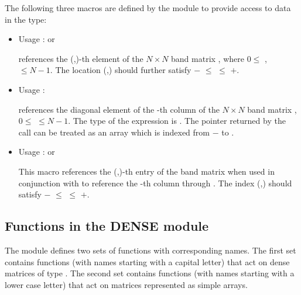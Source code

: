 The following three macros are defined by the {\band} module to provide
access to data in the  type:
\begin{itemize}
\item {}
  \par Usage :  or 
  \par {} references the (,)-th element of the
  $N \times N$ band matrix , where $0 \le$ ,  $\le N-1$.
  The location (,) should further satisfy 
  $-$ $\le$  $\le$ $+$.
\item {}
  \par Usage : 
  \par {} references the diagonal element of the -th
  column of the $N \times N$ band matrix , $0 \le$  $\le N-1$.
  The type of the expression  is . 
  The pointer returned by the call  can be treated as 
  an array which is indexed from $-$ to .
\item {}
  \par Usage :  or
  \par This macro references the (,)-th entry of the band matrix 
  when used in conjunction with  to reference the -th column through
  . The index (,) should satisfy 
  $-$ $\le$  $\le$ $+$.
\end{itemize}



\subsection{Functions in the DENSE module}\label{ss:dense}

The {\dense} module defines two sets of functions with corresponding names.
The first set contains functions (with names starting with a capital letter)
that act on dense matrices of type .  The second set contains functions
(with names starting with a lower case letter) that act on matrices represented 
as simple arrays.

